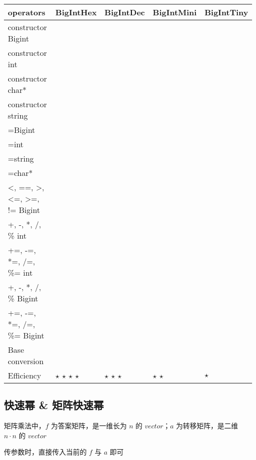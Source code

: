 \documentclass[12pt]{article}
\newcommand{\cmark}{\text{\color{ForestGreen}\ding{51}}}%
\newcommand{\xmark}{\text{\color{red}\ding{55}}}%
\begin{document}
\begin{table}[!ht]
	\centering
	\begin{tabular}{|l|l|l|l|l|}
		\hline
		operators & BigIntHex & BigIntDec & BigIntMini & BigIntTiny \\ \hline
		constructor Bigint & \cmark & \cmark & \cmark & \cmark \\ \hline
		constructor int & \cmark & \cmark & \cmark & \cmark \\ \hline
		constructor char* & \cmark & \cmark & \xmark & \xmark \\ \hline
		constructor string & \cmark & \cmark & \cmark & \cmark \\ \hline
		=Bigint & \cmark & \cmark & \cmark & \cmark \\ \hline
		=int & \cmark & \cmark & \cmark & \cmark \\ \hline
		=string & \cmark & \cmark & \cmark & \cmark \\ \hline
		=char* & \cmark & \cmark & \cmark & \xmark \\ \hline
		<, ==, >, <=, >=, != Bigint & \cmark & \cmark & \cmark & \cmark \\ \hline
		+, -, *, /, \% int & \xmark & \xmark & \xmark & \cmark \\ \hline
		+=, -=, *=, /=, \%= int & \xmark & \xmark & \xmark & \xmark \\ \hline
		+, -, *, /, \% Bigint & \cmark & \cmark & \cmark & \cmark \\ \hline
		+=, -=, *=, /=, \%= Bigint & \cmark & \cmark & \xmark & \xmark \\ \hline
		Base conversion & \cmark & \cmark & \xmark & \xmark \\ \hline
		Efficiency & $\star$ $\star$ $\star$ $\star$ & $\star$ $\star$ $\star$ & $\star$ $\star$ & $\star$ \\ \hline
	\end{tabular}
\end{table}



\newpage

\subsection{快速幂 \& 矩阵快速幂}

矩阵乘法中，$f$ 为答案矩阵，是一维长为 $n$ 的 $vector$；$a$ 为转移矩阵，是二维 $n\cdot n$ 的 $vector$

传参数时，直接传入当前的 $f$ 与 $a$ 即可
\end{document}
